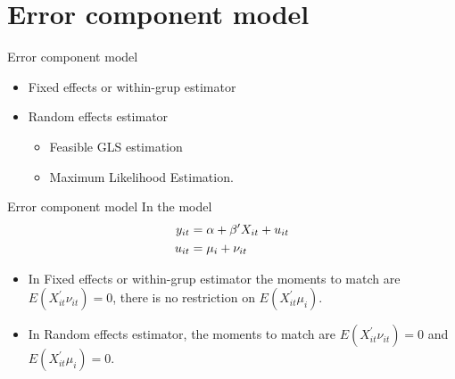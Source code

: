 \section{Error component model}
\begin{frame}{Error component model}
	\begin{itemize}
		\item Fixed effects or within-grup estimator
		\item Random effects estimator
			\begin{itemize}
				\item Feasible GLS estimation
				\item Maximum Likelihood Estimation.
			\end{itemize}
	\end{itemize}
\end{frame}
\begin{frame}{Error component model}
	In the model
		\begin{align}
			y_{it} & = \alpha +\beta ^{\prime }X_{it}+u_{it} \\
			u_{it} & = \mu _{i}+\nu _{it}  \notag
		\end{align}
	\begin{itemize}
		\item In Fixed effects or within-grup estimator the moments to match are $E\left(X_{it}^{\prime}\nu_{it}\right)=0$, there is no restriction on $E\left(X_{it}^{\prime}\mu_{i}\right).$
		\item In Random effects estimator, the moments to match are $E\left(X_{it}^{\prime}\nu_{it}\right) = 0$ and $E\left( X_{it}^{\prime}\mu_{i}\right)=0.$
	\end{itemize}
\end{frame}